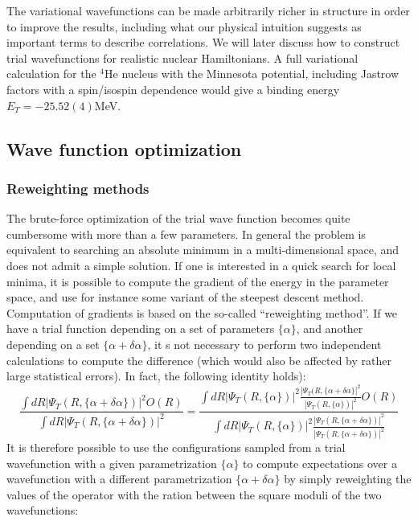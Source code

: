 The variational wavefunctions can be made arbitrarily richer in structure in order to improve the results, including what our physical intuition suggests as important terms to describe correlations. We will later discuss how to construct trial wavefunctions for realistic nuclear Hamiltonians.
A full variational calculation for the $^4$He nucleus with the Minnesota potential, including Jastrow factors with a spin/isospin dependence would give a binding energy $E_T=-25.52(4)$MeV.

 

\subsection{Wave function optimization}
\subsubsection{Reweighting methods}
The brute-force optimization of the trial wave function becomes quite cumbersome with more than a few parameters. In general the problem is equivalent to searching an absolute minimum in a multi-dimensional space, and does not admit a simple solution.
If one is interested in a quick search for local minima, it is possible to compute the gradient of the energy in the parameter space, and use for instance some variant of the steepest descent method. Computation of gradients is based on the so-called ``reweighting method''. If we have a trial function depending on a set of parameters $\{\alpha\}$, and another depending on a set $\{\alpha+\delta\alpha\}$, it s not necessary to perform two independent calculations to compute the difference (which would also be affected by rather large statistical errors). In fact, the following identity holds):
\begin{equation}
\frac{\int dR |\Psi_T(R,\{\alpha+\delta\alpha\})|^2 O(R)}{\int dR |\Psi_T(R,\{\alpha+\delta\alpha\})|^2}=
\frac{\int dR |\Psi_T(R,\{\alpha\})|^2 \frac{|\Psi_T(R,\{\alpha+\delta\alpha\}|^2}{|\Psi_T(R,\{\alpha\})|^2}O(R)}{\int dR |\Psi_T(R,\{\alpha\})|^2\frac{|\Psi_T(R,\{\alpha+\delta\alpha\})|^2}{|\Psi_T(R,\{\alpha+\delta\alpha\})|^2}}
\end{equation}
It is therefore possible to use the configurations sampled from a trial wavefunction with a given parametrization $\{\alpha\}$ to compute expectations over a wavefunction with a different parametrization $\{\alpha+\delta\alpha\}$ by simply reweighting the values of the operator with the ration between the square moduli of the two wavefunctions:
